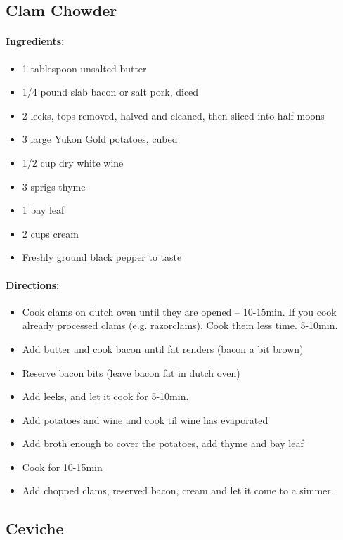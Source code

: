 \documentclass{article}
\begin{document}
\subsection{Clam Chowder}

\paragraph{Ingredients:}
\begin{itemize}
    \item 1 tablespoon unsalted butter
    \item 1/4 pound slab bacon or salt pork, diced
    \item 2 leeks, tops removed, halved and cleaned, then sliced into half moons
    \item 3 large Yukon Gold potatoes, cubed
    \item 1/2 cup dry white wine
    \item 3 sprigs thyme
    \item 1 bay leaf
    \item 2 cups cream
    \item Freshly ground black pepper to taste
\end{itemize}

\paragraph{Directions:}
\begin{itemize}
    \item Cook clams on dutch oven until they are opened -- 10-15min. If you cook already processed clams (e.g. razorclams). Cook them less time. 5-10min.
    \item Add butter and cook bacon until fat renders (bacon a bit brown)
    \item Reserve bacon bits (leave bacon fat in dutch oven)
    \item Add leeks, and let it cook for 5-10min.
    \item Add potatoes and wine and cook til wine has evaporated
    \item Add broth enough to cover the potatoes, add thyme and bay leaf
    \item Cook for 10-15min
    \item Add chopped clams, reserved bacon, cream and let it come to a simmer.
\end{itemize}

\subsection{Ceviche}
\end{document}
